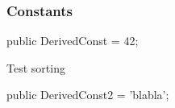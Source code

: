 \documentclass{report}
\newif\ifpdf
\begin{document}
\subsubsection*{\large{\textbf{Constants}}\normalsize\hspace{1ex}\hfill}
\begin{list}{}{
\setlength{\itemindent}{0cm}
\setlength{\listparindent}{0cm}
\setlength{\leftmargin}{\evensidemargin}
\addtolength{\leftmargin}{\tmplength}
\settowidth{\labelsep}{X}
\addtolength{\leftmargin}{\labelsep}
\setlength{\labelwidth}{\tmplength}
}
\label{ok_inherited_members.TDerived-DerivedConst}
\item[\textbf{DerivedConst}\hfill]
\ifpdf
\begin{flushleft}
\fi
\begin{ttfamily}
public DerivedConst = 42;\end{ttfamily}

\ifpdf
\end{flushleft}
\fi


\par Test sorting\label{ok_inherited_members.TDerived-DerivedConst2}
\item[\textbf{DerivedConst2}\hfill]
\ifpdf
\begin{flushleft}
\fi
\begin{ttfamily}
public DerivedConst2 = 'blabla';\end{ttfamily}

\ifpdf
\end{flushleft}
\fi


\par  \end{list}
\end{document}
